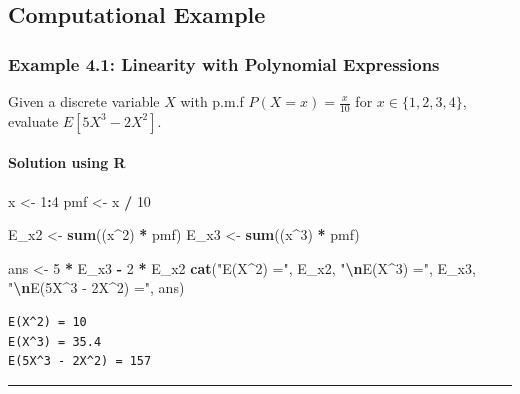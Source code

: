 \documentclass[
]{article}
\newenvironment{Shaded}{\begin{snugshade}}{\end{snugshade}}
\newcommand{\DecValTok}[1]{\textcolor[rgb]{0.00,0.00,0.81}{#1}}
\newcommand{\FunctionTok}[1]{\textcolor[rgb]{0.13,0.29,0.53}{\textbf{#1}}}
\newcommand{\NormalTok}[1]{#1}
\newcommand{\OtherTok}[1]{\textcolor[rgb]{0.56,0.35,0.01}{#1}}
\newcommand{\SpecialCharTok}[1]{\textcolor[rgb]{0.81,0.36,0.00}{\textbf{#1}}}
\newcommand{\StringTok}[1]{\textcolor[rgb]{0.31,0.60,0.02}{#1}}
\begin{document}
\subsection{Computational Example}\label{computational-example}

\subsubsection{Example 4.1: Linearity with Polynomial
Expressions}\label{example-4.1-linearity-with-polynomial-expressions}

Given a discrete variable \(X\) with p.m.f \(P(X=x) = \frac{x}{10}\) for
\(x \in \{1, 2, 3, 4\}\), evaluate \(E[5X^3 - 2X^2]\).

\paragraph{Solution using R}\label{solution-using-r}

\begin{Shaded}
\begin{Highlighting}[]
\NormalTok{x }\OtherTok{\textless{}{-}} \DecValTok{1}\SpecialCharTok{:}\DecValTok{4}
\NormalTok{pmf }\OtherTok{\textless{}{-}}\NormalTok{ x }\SpecialCharTok{/} \DecValTok{10}

\NormalTok{E\_x2 }\OtherTok{\textless{}{-}} \FunctionTok{sum}\NormalTok{((x}\SpecialCharTok{\^{}}\DecValTok{2}\NormalTok{) }\SpecialCharTok{*}\NormalTok{ pmf)}
\NormalTok{E\_x3 }\OtherTok{\textless{}{-}} \FunctionTok{sum}\NormalTok{((x}\SpecialCharTok{\^{}}\DecValTok{3}\NormalTok{) }\SpecialCharTok{*}\NormalTok{ pmf)}

\NormalTok{ans }\OtherTok{\textless{}{-}} \DecValTok{5} \SpecialCharTok{*}\NormalTok{ E\_x3 }\SpecialCharTok{{-}} \DecValTok{2} \SpecialCharTok{*}\NormalTok{ E\_x2}
\FunctionTok{cat}\NormalTok{(}\StringTok{"E(X\^{}2) ="}\NormalTok{, E\_x2, }\StringTok{"}\SpecialCharTok{\textbackslash{}n}\StringTok{E(X\^{}3) ="}\NormalTok{, E\_x3, }\StringTok{"}\SpecialCharTok{\textbackslash{}n}\StringTok{E(5X\^{}3 {-} 2X\^{}2) ="}\NormalTok{, ans)}
\end{Highlighting}
\end{Shaded}

\begin{verbatim}
E(X^2) = 10 
E(X^3) = 35.4 
E(5X^3 - 2X^2) = 157
\end{verbatim}

\begin{center}\rule{0.5\linewidth}{0.5pt}\end{center}
\end{document}
